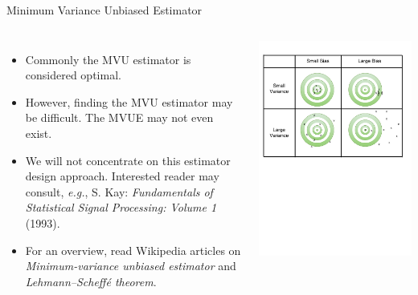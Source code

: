 \documentclass[10pt, aspectratio=169]{beamer} %
\begin{document}
\begin{frame}{Minimum Variance Unbiased Estimator}
\begin{columns}
\begin{itemize}
\item Commonly the MVU estimator is considered optimal.
\item However, finding the MVU estimator may be difficult. The MVUE may not even exist.
\item We will not concentrate on this estimator design approach.
Interested reader may consult, \emph{e.g.}, S. Kay: \emph{Fundamentals of Statistical Signal Processing: Volume 1}  (1993).
\item For an overview, read Wikipedia articles on \emph{Minimum-variance unbiased estimator}
and \emph{Lehmann--Scheff\'e theorem}.
\end{itemize}
\includegraphics[width=\textwidth]{BiasVariance.pdf}
\end{columns}
\end{frame}
\end{document}
